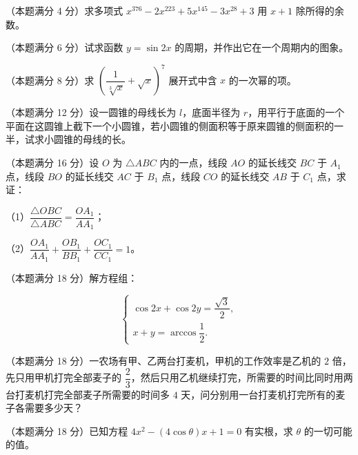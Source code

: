 


\begin{question}
（本题满分 4 分）求多项式 $x^{376}-2x^{223}+5x^{145}-3x^{28}+3$ 用 $x+1$ 除所得的余数。

\end{question}
\begin{question}
（本题满分 6 分）试求函数 $y=\sin 2x$ 的周期，并作出它在一个周期内的图象。

\end{question}
\begin{question}
（本题满分 8 分）求 $\left(\dfrac{1}{\sqrt[3]{x}}+\sqrt{x}\right)^7$ 展开式中含 $x$ 的一次幂的项。

\end{question}
\begin{question}
（本题满分 12 分）设一圆锥的母线长为 $l$，底面半径为 $r$，用平行于底面的一个平面在这圆锥上截下一个小圆锥，若小圆锥的侧面积等于原来圆锥的侧面积的一半，试求小圆锥的母线的长。

\end{question}

\begin{question}
（本题满分 16 分）设 $O$ 为 $\triangle ABC$ 内的一点，线段 $AO$ 的延长线交 $BC$ 于 $A_1$ 点，线段 $BO$ 的延长线交 $AC$ 于 $B_1$ 点，线段 $CO$ 的延长线交 $AB$ 于 $C_1$ 点，求证：

（1）$\dfrac{\triangle OBC}{\triangle ABC}=\dfrac{OA_1}{AA_1}$；

（2）$\dfrac{OA_1}{AA_1}+\dfrac{OB_1}{BB_1}+\dfrac{OC_1}{CC_1}=1$。

\end{question}
\begin{question}
（本题满分 18 分）解方程组：

\[
\begin{cases}
\cos 2x+\cos 2y=\dfrac{\sqrt3}{2},\\[2pt]
x+y=\arccos\dfrac12.
\end{cases}
\]

\end{question}
\begin{question}
（本题满分 18 分）一农场有甲、乙两台打麦机，甲机的工作效率是乙机的 $2$ 倍，先只用甲机打完全部麦子的 $\dfrac23$，然后只用乙机继续打完，所需要的时间比同时用两台打麦机打完全部麦子所需要的时间多 $4$ 天，问分别用一台打麦机打完所有的麦子各需要多少天？

\end{question}
\begin{question}
（本题满分 18 分）已知方程 $4x^2-(4\cos\theta)x+1=0$ 有实根，求 $\theta$ 的一切可能的值。

\end{question}